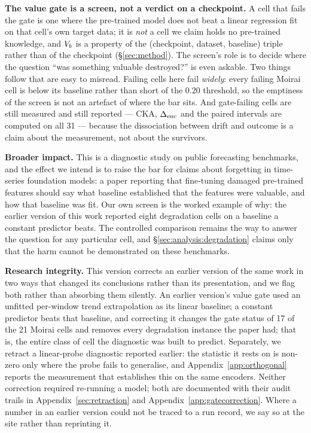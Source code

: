 \textbf{The value gate is a screen, not a verdict on a checkpoint.}  A cell that
fails the gate is one where the pre-trained model does not beat a linear regression
fit on that cell's own target data; it is \emph{not} a cell we claim holds no
pre-trained knowledge, and $V_{b}$ is a property of the (checkpoint, dataset,
baseline) triple rather than of the checkpoint (\S\ref{sec:method}).  The screen's
role is to decide where the question ``was something valuable destroyed?'' is even
askable.  Two things follow that are easy to misread.  Failing cells here fail
\emph{widely}: every failing Moirai cell is below its baseline rather than short of
the $0.20$ threshold, so the emptiness of the screen is not an artefact of where the
bar sits.  And gate-failing cells are still measured and still reported --- CKA,
$\Delta_\text{enc}$ and the paired intervals are computed on all 31 --- because the dissociation
between drift and outcome is a claim about the measurement, not about the survivors.

\textbf{Broader impact.}  This is a diagnostic study on public forecasting
benchmarks, and the effect we intend is to raise the bar for claims about
forgetting in time-series foundation models: a paper reporting that fine-tuning
damaged pre-trained features should say what baseline established that the
features were valuable, and how that baseline was fit.  Our own screen is the
worked example of why: the earlier version of this work reported eight
degradation cells on a baseline a constant predictor beats.  The controlled
comparison remains the way to answer the question for any particular cell, and
\S\ref{sec:analysis:degradation} claims only that the harm cannot be demonstrated
on these benchmarks.

\textbf{Research integrity.}  This version corrects an earlier version of the
same work in two ways that changed its conclusions rather than its presentation,
and we flag both rather than absorbing them silently.  An earlier version's value
gate used an unfitted per-window trend extrapolation as its linear baseline; a
constant predictor beats that baseline, and correcting it changes the gate status
of 17 of the 21 Moirai cells and removes every degradation instance the paper had;
that is, the entire class of cell the diagnostic was built to
predict.  Separately, we retract a linear-probe diagnostic
reported earlier: the statistic it rests on is non-zero only where the probe
fails to generalise, and Appendix~\ref{app:orthogonal} reports the measurement
that establishes this on the same encoders.  Neither correction required
re-running a model; both are documented with their audit trails in
Appendix~\ref{sec:retraction} and Appendix~\ref{app:gatecorrection}.  Where a
number in an earlier version could not be traced to a run record, we say so at
the site rather than reprinting it.

